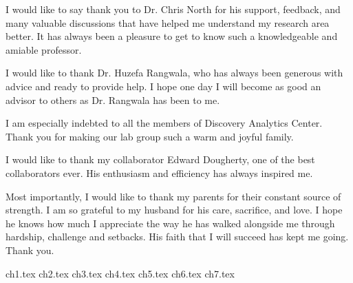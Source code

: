 \documentclass[12pt,dvips]{report}
\begin{document}
I would like to say thank you to Dr. Chris North for his support, feedback, and many valuable discussions that have helped me understand my research area better. It has always been a pleasure to get to know such a knowledgeable and amiable professor.

I would like to thank Dr. Huzefa Rangwala, who has always been generous with advice and ready to provide help. I hope one day I will become as good an advisor to others as Dr. Rangwala has been to me.

I am especially indebted to all the members of Discovery Analytics Center. Thank you for making our lab group such a warm and joyful family.

I would like to thank my collaborator Edward Dougherty, one of the best collaborators ever. His enthusiasm and efficiency has always inspired me.

Most importantly, I would like to thank my parents for their constant source of strength. I am so grateful to my husband for his care, sacrifice, and love. I hope he knows how much I appreciate the way he has walked alongside me through hardship, challenge and setbacks. His faith that I will succeed has kept me going. Thank you.




\tableofcontents
\pagebreak

\listoffigures
\pagebreak

\listoftables
\pagebreak

\pagestyle{myheadings}

{ch1.tex}%
{ch2.tex}%
{ch3.tex}%
{ch4.tex}%
{ch5.tex}%
{ch6.tex}%
{ch7.tex}%



%





\end{document}
